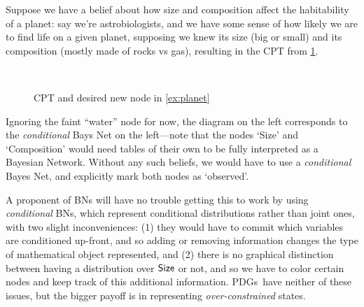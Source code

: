 \documentclass{article}
\newcommand\changed[1]{{\color{note-fg} #1}}
\newcommand{\MN}{PDG}
\newcommand{\MNs}{\MN s}
\begin{document}
	
	\begin{example} \label{ex:planet}
		Suppose we have a belief about how size and composition affect the habitability of a planet: say we're astrobiologists, and we have some sense of how likely we are to find life on a given planet, supposing we knew its size (big or small) and its composition (mostly made of rocks vs gas), \changed{resulting in the CPT from \cref{fig:planet-initial}.}
		
		\begin{figure}[h]
			\centering
			~~
			\caption{CPT and desired new node in \cref{ex:planet}}
			\label{fig:planet-initial}
		\end{figure}
		\vspace{1em}
	
		\changed{Ignoring the faint ``water'' node for now, the diagram on the left corresponds to the \emph{conditional} Bays Net on the left---note that the nodes `Size' and `Composition' would need tables of their own to be fully interpreted as a Bayesian Network. Without any such beliefs, we would have to use a \emph{conditional} Bayes Net, and explicitly mark both nodes as `observed'.}
		
		\begin{vfull}
			A proponent of BNs will have no trouble getting this to work by using \emph{conditional} BNs, which represent conditional distributions rather than joint ones, with two slight inconveniences: (1) they would have to commit which variables are conditioned up-front, and so adding or removing information changes the type of mathematical object represented, and (2) there is no graphical distinction between having a distribution over $\sf Size$ or not, and so we have to color certain nodes and keep track of this additional information. \MNs\ have neither of these issues, but the bigger payoff is in representing \textit{over-constrained} states.
		\end{vfull}


\end{example}
\end{document}
